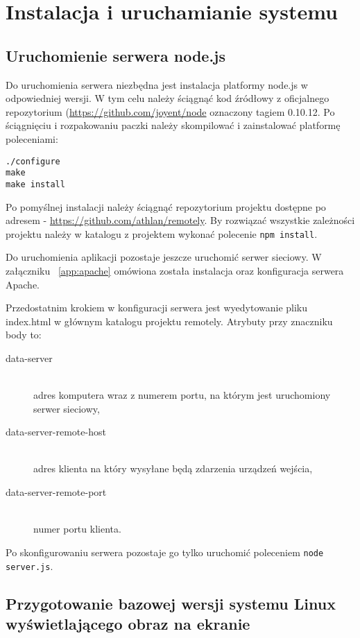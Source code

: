 \newpage
\section{Instalacja i uruchamianie systemu}

\subsection{Uruchomienie serwera node.js}
\label{subsub:setup-server-nodejs}

Do uruchomienia serwera niezbędna jest instalacja platformy node.js w odpowiedniej wersji. W tym celu należy ściągnąć kod źródłowy z oficjalnego repozytorium (\url{https://github.com/joyent/node} oznaczony tagiem 0.10.12. Po ściągnięciu i rozpakowaniu paczki należy skompilować i zainstalować platformę poleceniami:

\begin{lstlisting}
./configure
make
make install
\end{lstlisting}

Po pomyślnej instalacji należy ściągnąć repozytorium projektu dostępne po adresem - \url{https://github.com/athlan/remotely}. By rozwiązać wszystkie zależności projektu należy w katalogu z projektem wykonać polecenie \lstinline{npm install}.
\par
Do uruchomienia aplikacji pozostaje jeszcze uruchomić serwer sieciowy. W załączniku ~\ref{app:apache} omówiona została instalacja oraz konfiguracja serwera Apache.
\par
Przedostatnim krokiem w konfiguracji serwera jest wyedytowanie pliku index.html w głównym katalogu projektu remotely. Atrybuty przy znaczniku body to:
\begin{description}
	\item[data-server] \hfill \\
		adres komputera wraz z numerem portu, na którym jest uruchomiony serwer sieciowy,
	\item[data-server-remote-host] \hfill \\
		adres klienta na który wysyłane będą zdarzenia urządzeń wejścia,
	\item[data-server-remote-port] \hfill \\
		numer portu klienta.
\end{description}
\par
Po skonfigurowaniu serwera pozostaje go tylko uruchomić poleceniem \lstinline{node server.js}.


\subsection{Przygotowanie bazowej wersji systemu Linux wyświetlającego obraz na ekranie}


